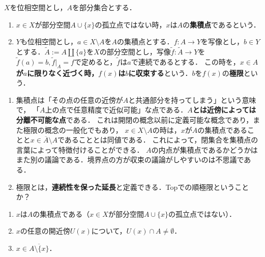 \documentclass[uplatex,dvipdfmx]{jsreport}
\begin{document}
\begin{definition}\label{def-accumulation-point}
    $X$を位相空間とし，$A$を部分集合とする．
    \begin{enumerate}
        \item $x\in X$が部分空間$A\cup\{x\}$の孤立点ではない時，$x$は$A$の\textbf{集積点}であるという．
        \item $Y$も位相空間とし，$a\in X\setminus A$を$A$の集積点とする．$f:A\to Y$を写像とし，$b\in Y$とする．$\widetilde{A}:=A\coprod\{a\}$を$X$の部分空間とし，写像$\tilde{f}:\widetilde{A}\to Y$を$\tilde{f}(a)=b,\tilde{f}|_A=f$で定めると，$\tilde{f}$は$a$で連続であるとする．
        この時を，\textbf{$x\in A$が$a$に限りなく近づく時，$f(x)$は$b$に収束する}という．$b$を$f(x)$の\textbf{極限}という．
    \end{enumerate}
\end{definition}
\begin{remark}[まさかこんな捉え方があるとは]\mbox{}
    \begin{enumerate}
        \item 集積点は「その点の任意の近傍が$A$と共通部分を持ってしまう」という意味で，
        「$A$上の点で任意精度で近似可能」な点である．\textbf{$A$とは近傍によっては分離不可能な点}である．
        これは開閉の概念以前に定義可能な概念であり，また極限の概念の一般化でもあり，
        $x\in X\setminus A$の時は，$x$が$A$の集積点であることと$x\in\overline{A}\setminus A$であることとは同値である．
        これによって，閉集合を集積点の言葉によって特徴付けることができる．
        $A$の内点が集積点であるかどうかはまた別の議論である．境界点の方が収束の議論がしやすいのは不思議である．
        \item 極限とは，\textbf{連続性を保った延長}と定義できる．Topでの順極限ということか？
    \end{enumerate}
\end{remark}

\begin{lemma}[集積点の特徴付け]\mbox{}
    \begin{enumerate}
        \item $x$は$A$の集積点である（$x\in X$が部分空間$A\cup\{x\}$の孤立点ではない）．
        \item $x$の任意の開近傍$U(x)$について，$U(x)\cap A\ne\emptyset$．
        \item $x\in\overline{A\setminus\{x\}}$．
    \end{enumerate}
\end{lemma}
\end{document}
